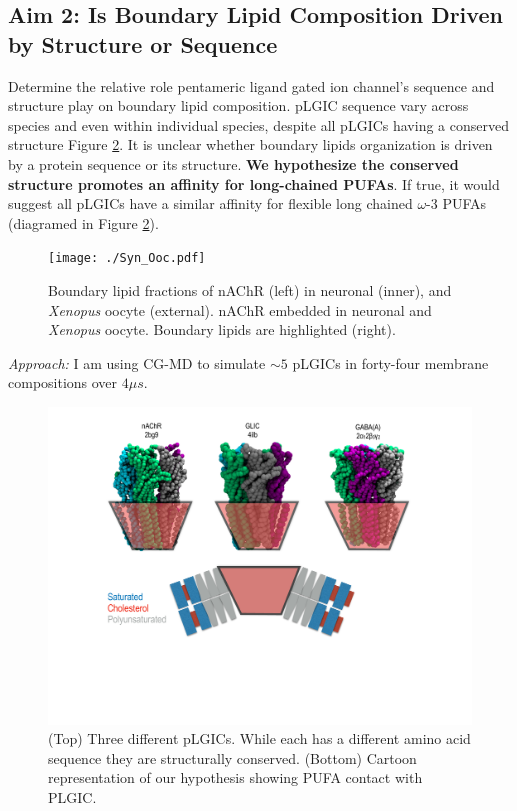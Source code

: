 \documentclass[9pt]{extarticle} %
\begin{document}
\subsection*{Aim 2: Is Boundary Lipid Composition Driven by Structure or Sequence}

 Determine the relative role pentameric ligand gated ion channel's sequence and structure play on boundary lipid composition. pLGIC sequence vary across species and even within individual species, despite all pLGICs having a conserved structure  Figure \ref{fig:fig3}. It is unclear whether boundary lipids organization is driven by a protein sequence or its structure. \textbf{We hypothesize the conserved structure promotes an affinity for long-chained PUFAs}\cite{Sharp2019,Woods2019}. If true, it would suggest all pLGICs have a similar affinity for flexible long chained $\omega$-3 PUFAs (diagramed in Figure \ref{fig:fig3}).

\begin{figure}
    \center
    \texttt{[image: ./Syn\_Ooc.pdf]}
    \caption{Boundary lipid fractions of nAChR (left) in neuronal (inner), and \textit{Xenopus} oocyte (external). nAChR embedded in neuronal and \textit{Xenopus} oocyte. Boundary lipids are highlighted (right).}
    \label{fig:fig2}
\end{figure}

\textit{Approach:} I am using CG-MD to simulate $\sim 5$ pLGICs in forty-four membrane compositions over $4\mu s$.

\begin{figure}
    \center
    \includegraphics[width=.5\linewidth]{Fig2.pdf}
    \caption{(Top) Three different pLGICs. While each has a different amino acid sequence they are structurally conserved. (Bottom) Cartoon representation of our hypothesis showing PUFA contact with PLGIC.}
    \label{fig:fig3}
\end{figure}
\end{document}
